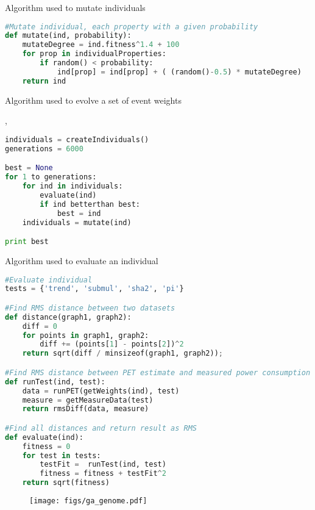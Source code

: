 \begin{algorithm}
\caption{Algorithm used to mutate individuals}
\label{lst:ga-mutate-algorithm}
\begin{lstlisting}[language=python]
#Mutate individual, each property with a given probability
def mutate(ind, probability):
    mutateDegree = ind.fitness^1.4 + 100
    for prop in individualProperties:
        if random() < probability:
            ind[prop] = ind[prop] + ( (random()-0.5) * mutateDegree)
    return ind
\end{lstlisting}
\end{algorithm}

\begin{algorithm}
\caption{Algorithm used to evolve a set of event weights}
\label{lst:ga-algorithm},
\begin{lstlisting}[language=python]
individuals = createIndividuals()
generations = 6000

best = None
for 1 to generations:
    for ind in individuals:
        evaluate(ind)
        if ind betterthan best:
            best = ind
    individuals = mutate(ind)

print best
\end{lstlisting}
\end{algorithm}

\begin{algorithm}
\caption{Algorithm used to evaluate an individual}
\label{lst:ga-eval-algorithm}
\begin{lstlisting}[language=python]
#Evaluate individual
tests = {'trend', 'submul', 'sha2', 'pi'}

#Find RMS distance between two datasets
def distance(graph1, graph2):
    diff = 0
    for points in graph1, graph2:
        diff += (points[1] - points[2])^2
    return sqrt(diff / minsizeof(graph1, graph2));

#Find RMS distance between PET estimate and measured power consumption
def runTest(ind, test):
    data = runPET(getWeights(ind), test)
    measure = getMeasureData(test)
    return rmsDiff(data, measure)

#Find all distances and return result as RMS
def evaluate(ind):
    fitness = 0
    for test in tests:
        testFit =  runTest(ind, test)
        fitness = fitness + testFit^2
    return sqrt(fitness)
\end{lstlisting}
\end{algorithm}

\begin{figure}
    \centering
    \def\svgwidth{\columnwidth}
    \texttt{[image: figs/ga\_genome.pdf]}
\end{figure}

